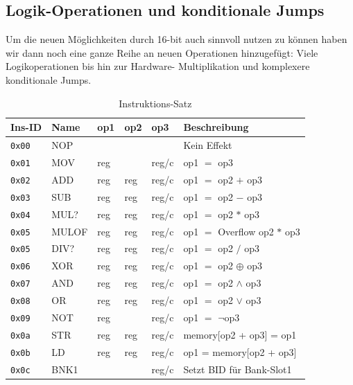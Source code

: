 \documentclass{scrartcl}
\begin{document}
    \subsection{Logik-Operationen und konditionale Jumps}
    Um die neuen Möglichkeiten durch 16-bit auch sinnvoll nutzen zu können haben wir dann noch eine ganze Reihe an neuen Operationen hinzugefügt:
    Viele Logikoperationen bis hin zur Hardware- Multiplikation und komplexere konditionale Jumps.
    \begin{center}
        \begin{table}
            \caption{\label{table:instructions}Instruktions-Satz}
            \begin{tabular}{l | l l l l | l}
                Ins-ID & Name & op1 & op2 & op3 & Beschreibung \\
                \hline
                \texttt{0x00} & NOP  &  &  &  & Kein Effekt  \\
                \hline
                \texttt{0x01} & MOV  & reg &  & reg/c & op1 $=$ op3\\
                \texttt{0x02} & ADD  & reg & reg & reg/c & op1 $=$ op2 $+$ op3 \\
                \texttt{0x03} & SUB  & reg & reg & reg/c & op1 $=$ op2 $-$ op3 \\
                \texttt{0x04} & MUL? & reg & reg & reg/c & op1 $=$ op2 $*$ op3 \\
                \texttt{0x05} & MULOF& reg & reg & reg/c & op1 $=$ Overflow op2 $*$ op3 \\
                \texttt{0x05} & DIV? & reg & reg & reg/c & op1 $=$ op2 $/$ op3 \\
                \texttt{0x06} & XOR  & reg & reg & reg/c & op1 $=$ op2 $\oplus$ op3 \\
                \texttt{0x07} & AND  & reg & reg & reg/c & op1 $=$ op2 $\land$ op3 \\
                \texttt{0x08} & OR   & reg & reg & reg/c & op1 $=$ op2 $\lor$ op3 \\
                \texttt{0x09} & NOT  & reg &  & reg/c & op1 $=$ $\lnot$op3 \\
                \hline
                \texttt{0x0a} & STR  & reg & reg & reg/c & memory[op2 + op3] = op1  \\
                \texttt{0x0b} & LD   & reg & reg & reg/c & op1 = memory[op2 + op3] \\
                \texttt{0x0c} & BNK1 &  &  & reg/c & Setzt BID für Bank-Slot1 \\

\end{tabular}
\end{table}
\end{center}
\end{document}
